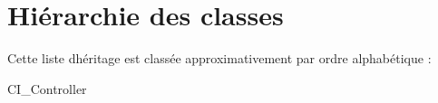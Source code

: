 \section{Hiérarchie des classes}
Cette liste d\textquotesingle{}héritage est classée approximativement par ordre alphabétique \+:\begin{DoxyCompactList}
\item C\+I\+\_\+\+Controller\begin{DoxyCompactList}
\item {}
\item {}
\item {}
\item {}
\end{DoxyCompactList}
\end{DoxyCompactList}
